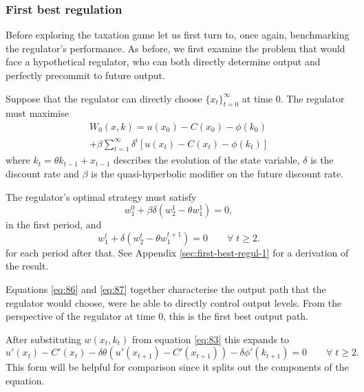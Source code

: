 \subsubsection{First best regulation}
\label{sec:first-best-regul}

Before exploring the taxation game let us first turn to, once again,
benchmarking the regulator's performance. As before, we first examine
the problem that would face a hypothetical regulator, who can both
directly determine output and perfectly precommit to future output.

Suppose that the regulator can directly choose $\{ x_t
\}_{t=0}^\infty$ at time $0$. The regulator must maximise
\begin{multline}
  \label{eq:38}W_0(x,k) = u(x_0) -
  C(x_0)  - \phi(k_0)\\ + \beta \sum_{t=1}^\infty \delta^i \left[ u(x_t) -
    C(x_t) - \phi(k_t) \right]
\end{multline}
where $k_t = \theta k_{t-1} + x_{t-1}$ describes the evolution of the
state variable, $\delta$ is the discount rate and $\beta$ is the
quasi-hyperbolic modifier on the future discount rate.

The regulator's optimal strategy must satisfy
\begin{equation}
  \label{eq:86} w^0_1 + \beta\delta \left(w^1_2 - \theta w^1_1 \right)
  = 0,
\end{equation}
in the first period, and
\begin{equation}
  \label{eq:87} w^t_1 + \delta \left(w^t_2 - \theta w^{t+1}_1 \right)
  = 0 \qquad \forall\; t \geq 2.
\end{equation}
for each period after that. See Appendix \ref{sec:first-best-regul-1}
for a derivation of the result.

Equations \eqref{eq:86} and \eqref{eq:87} together characterise the
output path that the regulator would choose, were he able to directly
control output levels. From the perspective of the regulator at time
$0$, this is the first best output path.

After substituting $w(x_t,k_t)$ from equation \eqref{eq:83} this
expands to
\begin{equation}
  \label{eq:45}
  u'(x_t) - C'(x_t) - \delta\theta \left( u'(x_{t+1}) -
    C'(x_{t+1})\right) - \delta\phi'(k_{t+1}) = 0 \qquad \forall\; t
  \geq 2.
\end{equation}
This form will be helpful for comparison since it splits out the
components of the equation.


